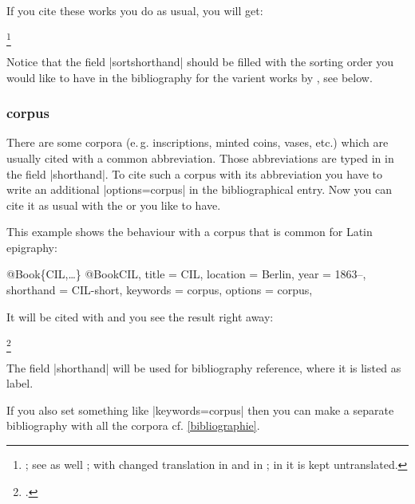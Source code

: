 \documentclass[a4paper,
10pt,
greek,
french,
spanish,
italian,
ngerman,
english
]{ltxdoc}
\begin{document}
If you cite these works you do as usual, you will get:
\begin{example}
\footnote{\cite[1,1,2]{Vitr}; see as well \cite{Vitr:Loeb}; with changed translation in \cite{Vitr:Krohn} and in \cite{Vitr:Saliou}; in \cite{Vitr:Fischer} it is kept untranslated.}
\end{example}


\begin{marker}
Notice that the field |sortshorthand| should be filled with the sorting order you would like to have in the bibliography for the varient works by \citeauthor{Vitr}, see below.
\end{marker}



\subsubsection{corpus}\label{corpus}
There are some corpora (e.\,g. inscriptions, minted coins, vases, etc.) which are usually cited with a common abbreviation. 
Those abbreviations are typed in in the field |shorthand|.
To cite such a corpus with its abbreviation you have to write an additional |options={corpus}| in the bibliographical entry.
Now you can cite it as usual with the  or  you like to have.

This example shows the behaviour with a corpus that is common for Latin epigraphy:
\begin{bibexample}[label=CIL]{{@}Book\{CIL,…\}}
@Book{CIL,
  title     = CIL, %
  location  = Berlin, %
  year      = {1863--},
  shorthand = CIL-short,  %
  keywords  = {corpus}, %
  options   = {corpus},
}
\end{bibexample}

It will be cited with and you see the result right away:
\begin{example}
\footnote{\cite[06, 01234]{CIL}.}
\end{example}

The field |shorthand| will be used for bibliography reference,
where it is listed as label.

If you also set something like |keywords={corpus}| then you can make a separate bibliography with all the corpora cf. \cref{bibliographie}.

\end{document}
